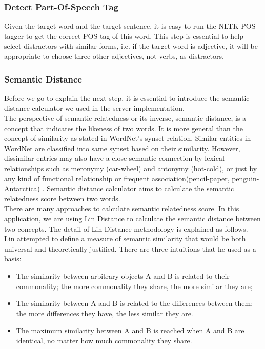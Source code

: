 \subsubsection{Detect Part-Of-Speech Tag}
Given the target word and the target sentence, it is easy to run the NLTK POS tagger to get the correct POS tag of this word. This step is essential to help select distractors with similar forms, i.e. if the target word is adjective, it will be appropriate to choose three other adjectives, not verbs, as distractors.
\\
\subsubsection{Semantic Distance}
Before we go to explain the next step, it is essential to introduce the semantic distance calculator we used in the server implementation. 
\\
The perspective of semantic relatedness or its inverse, semantic distance, is a concept that indicates the likeness of two words. It is more general than the concept of similarity as stated in WordNet’s synset relation. Similar entities in WordNet are classified into same synset based on their similarity. However, dissimilar entries may also have a close semantic connection by lexical relationships  such as meronymy (car-wheel) and antonymy (hot-cold), or just by any kind of functional relationship or frequent association(pencil-paper, penguin-Antarctica) \cite{ale01}. Semantic distance calculator aims to calculate the semantic relatedness score between two words.
\\
There are many approaches to calculate semantic relatedness score. In this application, we are using Lin Distance \cite{lin98} to calculate the semantic distance between two concepts. The detail of Lin Distance methodology is explained as follows.
\\
Lin attempted to define a measure of semantic similarity that would be both universal and theoretically justified. There are three intuitions that he used as a basis:
\begin{itemize}
\item The similarity between arbitrary objects A and B is related to their commonality; the more commonality they share, the more similar they are;
\item The similarity between A and B is related to the differences between them; the more differences they have, the less similar they are.
\item The maximum similarity between A and B is reached when A and B are identical, no matter how much commonality they share. 
\end{itemize}
